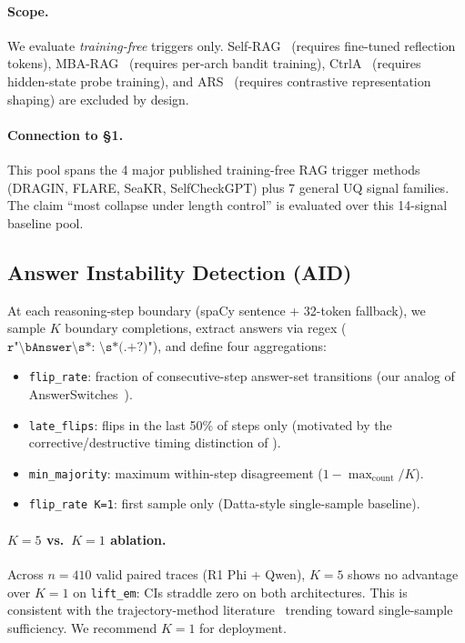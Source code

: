 \documentclass[11pt]{article}
\begin{document}
\paragraph{Scope.} We evaluate \emph{training-free} triggers only.
Self-RAG~\citep{Asai_SelfRAG} (requires fine-tuned reflection
tokens), MBA-RAG~\citep{Tang_MBARAG} (requires per-arch bandit
training), CtrlA~\citep{Liu_CtrlA} (requires hidden-state probe
training), and ARS~\citep{Zhang_AnswerAgreementRepresentationShaping}
(requires contrastive representation shaping) are excluded by design.

\paragraph{Connection to \S1.} This pool spans the 4 major published
training-free RAG trigger methods (DRAGIN, FLARE, SeaKR,
SelfCheckGPT) plus 7 general UQ signal families. The claim ``most
collapse under length control'' is evaluated over this 14-signal
baseline pool.


\subsection{Answer Instability Detection (AID)}

At each reasoning-step boundary (spaCy sentence + 32-token
fallback), we sample $K$ boundary completions, extract answers via
regex ($\texttt{r"\textbackslash bAnswer\textbackslash s*:
\textbackslash s*(.+?)"}$), and define four aggregations:

\begin{itemize}
\item \texttt{flip\_rate}: fraction of consecutive-step
answer-set transitions (our analog of
AnswerSwitches~\citep{Datta_DecideEarlyExplainLater}).
\item \texttt{late\_flips}: flips in the last 50\% of steps only
(motivated by the corrective/destructive timing distinction of
\cite{Chen_DynamicInstabilityLLMReasoning}).
\item \texttt{min\_majority}: maximum within-step disagreement
($1 - \max_{\text{count}}/K$).
\item \texttt{flip\_rate K=1}: first sample only (Datta-style
single-sample baseline).
\end{itemize}

\paragraph{$K{=}5$ vs.\ $K{=}1$ ablation.} Across $n{=}410$
valid paired traces (R1 Phi + Qwen), $K{=}5$ shows no advantage
over $K{=}1$ on \texttt{lift\_em}: CIs straddle zero on both
architectures. This is consistent with the trajectory-method
literature~\citep{Datta_DecideEarlyExplainLater,
Wang_ChainOfProbeCoTStepByStep, Mao_ConfidenceOverTimeSTL} trending
toward single-sample sufficiency.
We recommend $K{=}1$ for deployment.
\end{document}
